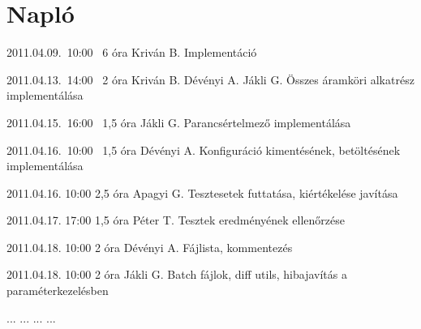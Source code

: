 %
\section{Napló}

\begin{naplo}

\bejegyzes
{2011.04.09.~10:00~} %
{6 óra} %
{Kriván B.} %
{Implementáció} %

\bejegyzes
{2011.04.13.~14:00~} %
{2 óra} %
{Kriván B.
Dévényi A.
Jákli G.} %
{Összes áramköri alkatrész implementálása} %

{2011.04.15.~16:00~} %
{1,5 óra} %
{Jákli G.} %
{Parancsértelmező implementálása} %

{2011.04.16.~10:00~} %
{1,5 óra} %
{Dévényi A.} %
{Konfiguráció kimentésének, betöltésének implementálása} %

\bejegyzes
{2011.04.16. 10:00} %
{2,5 óra} %
{Apagyi G.} %
{Tesztesetek futtatása, kiértékelése javítása} %

\bejegyzes
{2011.04.17. 17:00} %
{1,5 óra} %
{Péter T.} %
{Tesztek eredményének ellenőrzése} %

\bejegyzes
{2011.04.18. 10:00} %
{2 óra} %
{Dévényi A.} %
{Fájlista, kommentezés} %

\bejegyzes
{2011.04.18. 10:00} %
{2 óra} %
{Jákli G.} %
{Batch fájlok, diff utils, hibajavítás a paraméterkezelésben} %

\bejegyzes
{...}
{...}
{...}
{...}


\end{naplo}

